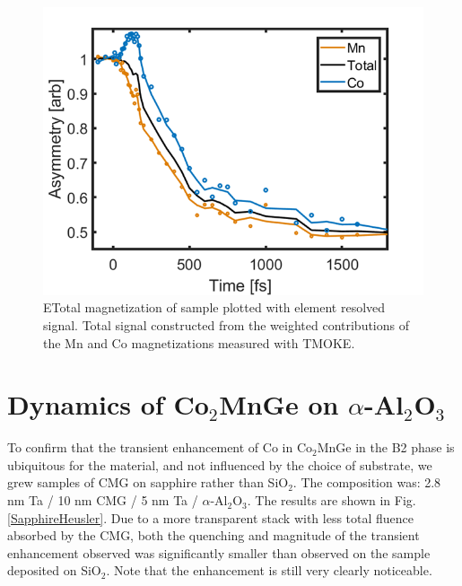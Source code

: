 \begin{figure}[htbp]
	\begin{center}
		\includegraphics[width=120mm]{figs/ElementAveMOKE}
	\end{center}
	\caption{ETotal magnetization of sample plotted with element resolved signal. Total signal constructed from the weighted contributions of the Mn and Co magnetizations measured with TMOKE.}
	\label{fig: ElementAveMOKE}
\end{figure}

\section{Dynamics of Co$_2$MnGe on $\alpha$-Al$_2$O$_3$}

To confirm that the transient enhancement of Co in Co$_2$MnGe in the B2 phase is ubiquitous for the material, and not influenced by the choice of substrate, we grew samples of CMG on sapphire rather than SiO$_2$. The composition was: 2.8 nm Ta / 10 nm CMG / 5 nm Ta / $\alpha$-Al$_2$O$_3$. The results are shown in Fig. \ref{SapphireHeusler}. Due to a more transparent stack with less total fluence absorbed by the CMG, both the quenching and magnitude of the transient enhancement observed was significantly smaller than observed on the sample deposited on SiO$_2$. Note that the enhancement is still very clearly noticeable.

